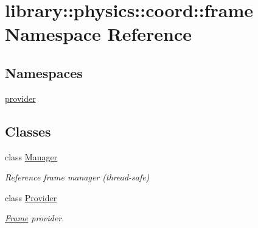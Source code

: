 \hypertarget{namespacelibrary_1_1physics_1_1coord_1_1frame}{}\section{library\+:\+:physics\+:\+:coord\+:\+:frame Namespace Reference}
\label{namespacelibrary_1_1physics_1_1coord_1_1frame}
\subsection*{Namespaces}
\begin{DoxyCompactItemize}
\item 
 \hyperlink{namespacelibrary_1_1physics_1_1coord_1_1frame_1_1provider}{provider}
\end{DoxyCompactItemize}
\subsection*{Classes}
\begin{DoxyCompactItemize}
\item 
class \hyperlink{classlibrary_1_1physics_1_1coord_1_1frame_1_1_manager}{Manager}
\begin{DoxyCompactList}\small\item\em Reference frame manager (thread-\/safe) \end{DoxyCompactList}\item 
class \hyperlink{classlibrary_1_1physics_1_1coord_1_1frame_1_1_provider}{Provider}
\begin{DoxyCompactList}\small\item\em \hyperlink{classlibrary_1_1physics_1_1coord_1_1_frame}{Frame} provider. \end{DoxyCompactList}\end{DoxyCompactItemize}
